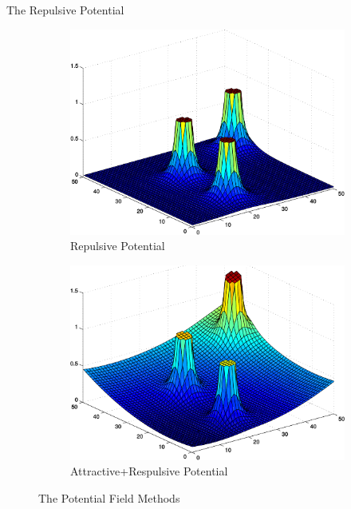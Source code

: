 \documentclass[8pt]{beamer}
\renewcommand{\|}[1][.3em]{\hspace{#1}|\hspace{#1}}
\renewcommand{\,}[1][.3em]{,\hspace{#1}}
\begin{document}
\begin{frame}{The Repulsive Potential}
\begin{itemize}
{\begin{figure}
\begin{subfigure}{0.4\textwidth}
    \includegraphics[width=\textwidth]{pf_3}
    \caption{Repulsive Potential}
    \end{subfigure}
    \begin{subfigure}{0.4\textwidth}
    \includegraphics[width=\textwidth]{pf_4}
    \caption{Attractive+Respulsive Potential}
    \end{subfigure}
    \caption{The Potential Field Methods}
\end{figure}}
\end{itemize}
\end{frame}
\end{document}
